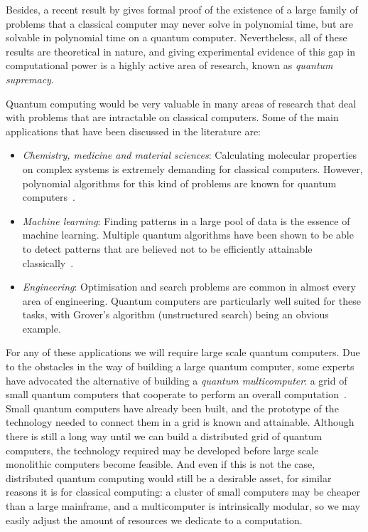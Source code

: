 Besides, a recent result by \citet{BQPSepPH} gives formal proof of the existence of a large family of problems that a classical computer may never solve in polynomial time, but are solvable in polynomial time on a quantum computer. Nevertheless, all of these results are theoretical in nature, and giving experimental evidence of this gap in computational power is a highly active area of research, known as \textit{quantum supremacy}. 

Quantum computing would be very valuable in many areas of research that deal with problems that are intractable on classical computers. Some of the main applications that have been discussed in the literature are:

\begin{itemize}
\item \textit{Chemistry, medicine and material sciences}: Calculating molecular properties on complex systems is extremely demanding for classical computers. However, polynomial algorithms for this kind of problems are known for quantum computers~\citep{TowardsQuantumChemistry}. %
\item \textit{Machine learning}: Finding patterns in a large pool of data is the essence of machine learning. Multiple quantum algorithms have been shown to be able to detect patterns that are believed not to be efficiently attainable classically~\citep{QuantumMachineLearning}.
\item \textit{Engineering}: Optimisation and search problems are common in almost every area of engineering. Quantum computers are particularly well suited for these tasks, with Grover's algorithm (unstructured search) being an obvious example.
\end{itemize}

For any of these applications we will require large scale quantum computers. Due to the obstacles in the way of building a large quantum computer, some experts have advocated the alternative of building a \textit{quantum multicomputer}: a grid of small quantum computers that cooperate to perform an overall computation~\citep{DistributedQCHW}. Small quantum computers have already been built, and the prototype of the technology needed to connect them in a grid is known and attainable. Although there is still a long way until we can build a distributed grid of quantum computers, the technology required may be developed before large scale monolithic computers become feasible. And even if this is not the case, distributed quantum computing would still be a desirable asset, for similar reasons it is for classical computing: a cluster of small computers may be cheaper than a large mainframe, and a multicomputer is intrinsically modular, so we may easily adjust the amount of resources we dedicate to a computation.

